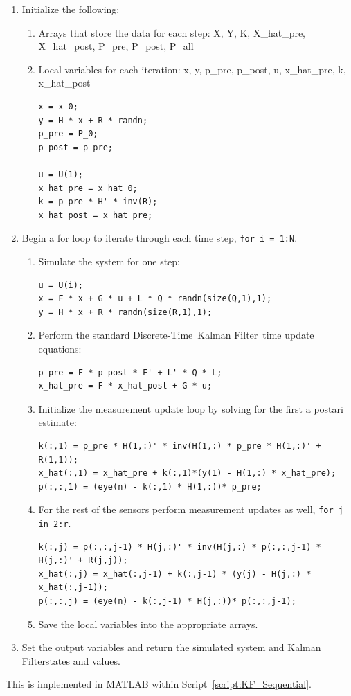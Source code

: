 \documentclass[]{article}
\renewcommand{\lstlistingname}{Script}
\newcommand{\scriptname}{\lstlistingname}
\newcommand{\KF}{Kalman Filter}
\newcommand{\DT}{Discrete-Time}
\newcommand{\DTKF}{\DT \ \KF}
\begin{document}
		\begin{enumerate}
			\item Initialize the following:
			\begin{enumerate}
				\item Arrays that store the data for each step: X, Y, K, X\_hat\_pre, X\_hat\_post, P\_pre, P\_post, P\_all\\
				\item Local variables for each iteration: x, y, p\_pre, p\_post, u, x\_hat\_pre, k, x\_hat\_post
\begin{lstlisting}
x = x_0;
y = H * x + R * randn;
p_pre = P_0;
p_post = p_pre;

u = U(1);
x_hat_pre = x_hat_0;
k = p_pre * H' * inv(R);
x_hat_post = x_hat_pre;
\end{lstlisting}
			\end{enumerate}
			\item Begin a for loop to iterate through each time step, \lstinline{for i = 1:N}.
			\begin{enumerate}
				\item Simulate the system for one step:
\begin{lstlisting}
u = U(i);
x = F * x + G * u + L * Q * randn(size(Q,1),1);
y = H * x + R * randn(size(R,1),1);
\end{lstlisting}
				\item Perform the standard \DTKF \ time update equations:
\begin{lstlisting}
p_pre = F * p_post * F' + L' * Q * L;
x_hat_pre = F * x_hat_post + G * u;
\end{lstlisting}
				\item Initialize the measurement update loop by solving for the first a postari estimate:
\begin{lstlisting}
k(:,1) = p_pre * H(1,:)' * inv(H(1,:) * p_pre * H(1,:)' + R(1,1));
x_hat(:,1) = x_hat_pre + k(:,1)*(y(1) - H(1,:) * x_hat_pre);
p(:,:,1) = (eye(n) - k(:,1) * H(1,:))* p_pre;
\end{lstlisting}
				\item For the rest of the sensors perform measurement updates as well, \lstinline{for j in 2:r}.
\begin{lstlisting}
k(:,j) = p(:,:,j-1) * H(j,:)' * inv(H(j,:) * p(:,:,j-1) * H(j,:)' + R(j,j));
x_hat(:,j) = x_hat(:,j-1) + k(:,j-1) * (y(j) - H(j,:) * x_hat(:,j-1));
p(:,:,j) = (eye(n) - k(:,j-1) * H(j,:))* p(:,:,j-1);
\end{lstlisting}
				\item Save the local variables into the appropriate arrays.
			\end{enumerate}
			\item Set the output variables and return the simulated system and \KF states and values.
		\end{enumerate}
		This is implemented in MATLAB within \scriptname \ \ref{script:KF_Sequential}.
	
\end{document}
